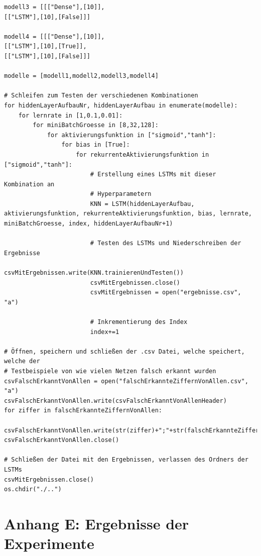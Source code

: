 \documentclass[a4paper,12pt,ngerman,oneside]{scrreprt}	%
\begin{document}
{\begin{lstlisting}
modell3 = [[["Dense"],[10]],
[["LSTM"],[10],[False]]]

modell4 = [[["Dense"],[10]],
[["LSTM"],[10],[True]],
[["LSTM"],[10],[False]]]

modelle = [modell1,modell2,modell3,modell4]

# Schleifen zum Testen der verschiedenen Kombinationen
for hiddenLayerAufbauNr, hiddenLayerAufbau in enumerate(modelle):
	for lernrate in [1,0.1,0.01]:
		for miniBatchGroesse in [8,32,128]:
			for aktivierungsfunktion in ["sigmoid","tanh"]:
				for bias in [True]:
					for rekurrenteAktivierungsfunktion in ["sigmoid","tanh"]:
						# Erstellung eines LSTMs mit dieser Kombination an
						# Hyperparametern
						KNN = LSTM(hiddenLayerAufbau, aktivierungsfunktion, rekurrenteAktivierungsfunktion, bias, lernrate, miniBatchGroesse, index, hiddenLayerAufbauNr+1)
						
						# Testen des LSTMs und Niederschreiben der Ergebnisse
						csvMitErgebnissen.write(KNN.trainierenUndTesten())
						csvMitErgebnissen.close()
						csvMitErgebnissen = open("ergebnisse.csv", "a")
						
						# Inkrementierung des Index
						index+=1

# Öffnen, speichern und schließen der .csv Datei, welche speichert, welche der
# Testbeispiele von wie vielen Netzen falsch erkannt wurden
csvFalschErkanntVonAllen = open("falschErkannteZiffernVonAllen.csv", "a")
csvFalschErkanntVonAllen.write(csvFalschErkanntVonAllenHeader)
for ziffer in falschErkannteZiffernVonAllen:
	csvFalschErkanntVonAllen.write(str(ziffer)+";"+str(falschErkannteZiffernVonAllen[ziffer])+"\n")
csvFalschErkanntVonAllen.close()

# Schließen der Datei mit den Ergebnissen, verlassen des Ordners der LSTMs
csvMitErgebnissen.close()
os.chdir("./..")
			\end{lstlisting}
		
		
		\newpage
		\vspace*{2cm}	
		\section*{Anhang E: Ergebnisse der Experimente}
			
			\def\myrot#1{\rotatebox{90}{\csname csvcol#1\endcsname\ }}



}
\end{document}
